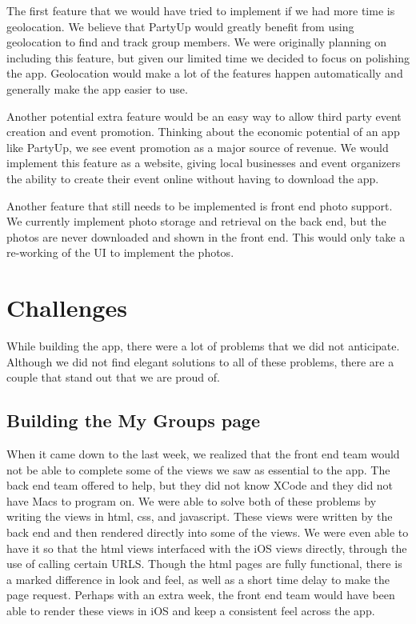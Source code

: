 \documentclass[12pt]{article}
\begin{document}
The first feature that we would have tried to implement if we had more time is geolocation.
We believe that PartyUp would greatly benefit from using geolocation to find and track group members.
We were originally planning on including this feature, but given our limited time we decided to focus on polishing the app. 
Geolocation would make a lot of the features happen automatically and generally make the app easier to use. 

Another potential extra feature would be an easy way to allow third party event creation and event promotion.
Thinking about the economic potential of an app like PartyUp, we see event promotion as a major source of revenue. 
We would implement this feature as a website, giving local businesses and event organizers the ability to create their event online without having to download the app.

Another feature that still needs to be implemented is front end photo support.
We currently implement photo storage and retrieval on the back end, but the photos are never downloaded and shown in the front end.
This would only take a re-working of the UI to implement the photos.

\section{Challenges}

While building the app, there were a lot of problems that we did not anticipate.
Although we did not find elegant solutions to all of these problems,
there are a couple that stand out that we are proud of.

\subsection{Building the My Groups page}

When it came down to the last week, we realized that the front end team would not be able to complete some of the views we saw as essential to the app. 
The back end team offered to help, but they did not know XCode and they did not have Macs to program on.
We were able to solve both of these problems by writing the views in  html, css, and javascript.
These views were written by the back end and then rendered directly into some of the views. 
We were even able to have it so that the html views interfaced with the iOS views directly, through the use of calling certain URLS. 
Though the html pages are fully functional, there is a marked difference in look and feel, as well as a short time delay to make the page request. 
Perhaps with an extra week, the front end team would have been able to render these views in iOS and keep a consistent feel across the app. 
\end{document}
